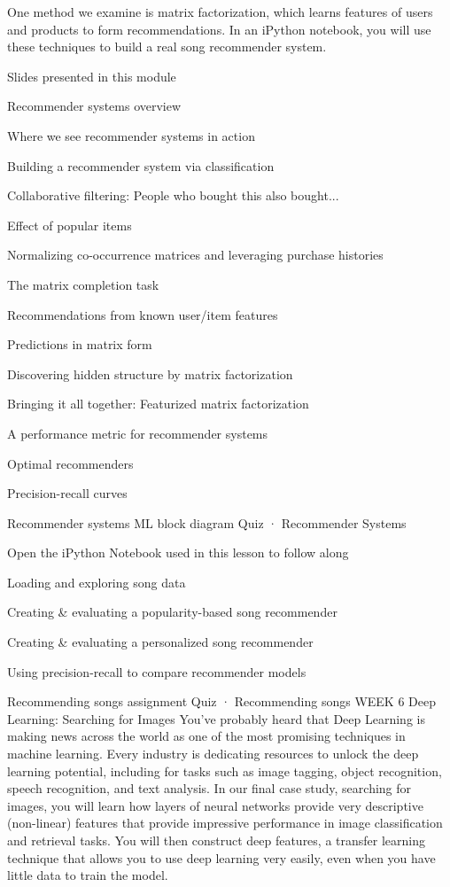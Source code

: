 One method we examine is matrix factorization, which learns features of users and products to form recommendations. In an iPython notebook, you will use these techniques to build a real song recommender system.
\item Slides presented in this module
\item Recommender systems overview
\item Where we see recommender systems in action
\item Building a recommender system via classification
\item Collaborative filtering: People who bought this also bought...
\item Effect of popular items
\item Normalizing co-occurrence matrices and leveraging purchase histories
\item The matrix completion task
\item Recommendations from known user/item features
\item Predictions in matrix form
\item Discovering hidden structure by matrix factorization
\item Bringing it all together: Featurized matrix factorization
\item A performance metric for recommender systems
\item Optimal recommenders
\item Precision-recall curves
\item Recommender systems ML block diagram
Quiz · Recommender Systems
\item Open the iPython Notebook used in this lesson to follow along
\item Loading and exploring song data
\item Creating & evaluating a popularity-based song recommender
\item Creating & evaluating a personalized song recommender
\item Using precision-recall to compare recommender models
\item Recommending songs assignment
Quiz · Recommending songs
WEEK 6
Deep Learning: Searching for Images
You’ve probably heard that Deep Learning is making news across the world as one of the most promising techniques in machine learning. Every industry is dedicating resources to unlock the deep learning potential, including for tasks such as image tagging, object recognition, speech recognition, and text analysis.
In our final case study, searching for images, you will learn how layers of neural networks provide very descriptive (non-linear) features that provide impressive performance in image classification and retrieval tasks. You will then construct deep features, a transfer learning technique that allows you to use deep learning very easily, even when you have little data to train the model.

